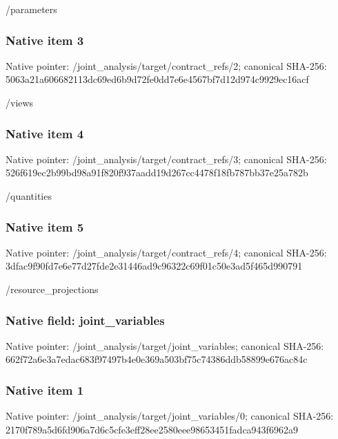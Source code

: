 \documentclass[10pt,a4paper]{article}
\begin{document}
/parameters


\subsubsection{Native item 3}


Native pointer: /joint\_analysis/target/contract\_refs/2; canonical SHA-256: 5063a21a606682113dc69ed6\allowbreak{}b9d72fe0dd7e6e4567bf7d12\allowbreak{}d974c9929ec16acf


/views


\subsubsection{Native item 4}


Native pointer: /joint\_analysis/target/contract\_refs/3; canonical SHA-256: 526f619ec2b99bd98a91f820\allowbreak{}f937aadd19d267cc4478f18f\allowbreak{}b787bb37e25a782b


/quantities


\subsubsection{Native item 5}


Native pointer: /joint\_analysis/target/contract\_refs/4; canonical SHA-256: 3dfac9f90fd7e6e77d27fde2\allowbreak{}e31446ad9c96322c69f01c50\allowbreak{}e3ad5f465d990791


/resource\_projections


\subsubsection{Native field: joint\_variables}


Native pointer: /joint\_analysis/target/joint\_variables; canonical SHA-256: 662f72a6e3a7edac683f9749\allowbreak{}7b4e0e369a503bf75c74386d\allowbreak{}db58899e676ac84c



\subsubsection{Native item 1}


Native pointer: /joint\_analysis/target/j\allowbreak{}oint\_variables/0; canonical SHA-256: 2170f789a5d6fd906a7d6c5c\allowbreak{}fe3eff28ee2580eee9865345\allowbreak{}1fadca943f6962a9
\end{document}

